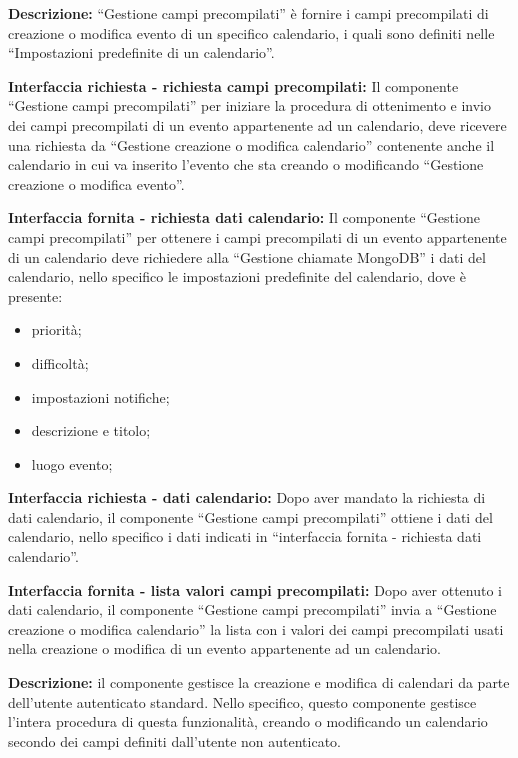 \begin{listaPersonale}[]{}

    \textbf{Descrizione:}  “Gestione campi precompilati” è fornire i campi precompilati di creazione o modifica evento di un specifico calendario, i quali sono definiti nelle “Impostazioni predefinite di un calendario”.

    \textbf{Interfaccia richiesta - richiesta campi precompilati:} Il componente “Gestione campi precompilati” per iniziare la procedura di ottenimento e invio dei campi precompilati di un evento appartenente ad un calendario, deve ricevere una richiesta da “Gestione creazione o modifica calendario” contenente anche il calendario in cui va inserito l'evento che sta creando o modificando “Gestione creazione o modifica evento”.

    \textbf{Interfaccia fornita - richiesta dati calendario:} Il componente “Gestione campi precompilati” per ottenere i campi precompilati di un evento appartenente di un calendario deve richiedere alla “Gestione chiamate MongoDB” i dati del calendario, nello specifico le impostazioni predefinite del calendario, dove è presente:
    \begin{itemize}
        \item priorità;
        \item difficoltà;
        \item impostazioni notifiche;
        \item descrizione e titolo;
        \item luogo evento;
    \end{itemize}

    \textbf{Interfaccia richiesta - dati calendario:} Dopo aver mandato la richiesta di dati calendario, il componente “Gestione campi precompilati” ottiene i dati del calendario, nello specifico i dati indicati in “interfaccia fornita - richiesta dati calendario”.

    \textbf{Interfaccia fornita - lista valori campi precompilati:} Dopo aver ottenuto i dati calendario, il componente “Gestione campi precompilati” invia a “Gestione creazione o modifica calendario” la lista con i valori dei campi precompilati usati nella creazione o modifica di un evento appartenente ad un calendario.



    \textbf{Descrizione:} il componente gestisce la creazione e modifica di calendari da parte dell'utente autenticato standard. Nello specifico, questo componente gestisce l'intera procedura di questa funzionalità, creando o modificando un calendario secondo dei campi definiti dall'utente non autenticato.


\end{listaPersonale}
